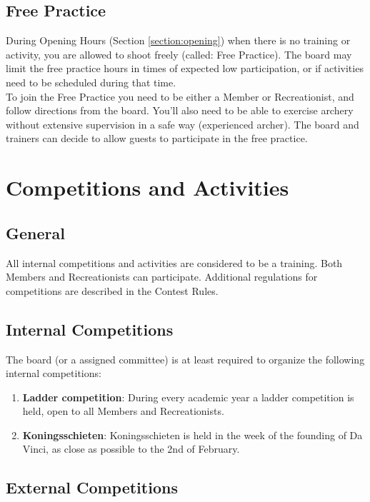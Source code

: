 \documentclass[a4paper]{article}
\newcommand{\Awr}{Contest Rules} %
\begin{document}
\subsection{Free Practice}
During Opening Hours (Section \ref{section:opening}) when there is no training or activity, you are allowed to shoot freely (called: Free Practice). The board may limit the free practice hours in times of expected low participation, or if activities need to be scheduled during that time. \\

To join the Free Practice you need to be either a { Member} or { Recreationist}, and follow directions from the board. You'll also need to be able to exercise archery without extensive supervision in a safe way ({ experienced} { archer}). The board and trainers can decide to allow { guests} to participate in the free practice.

\section{Competitions and Activities}
\subsection{General}
All internal competitions and activities are considered to be a training. Both { Members} and { Recreationists} can participate. Additional regulations for competitions are described in the { \Awr}.

\subsection{Internal Competitions}
The board (or a assigned committee) is at least required to organize the following internal competitions: \\
\begin{enumerate}
\item \textbf{Ladder competition}: During every academic year a ladder competition is held, open to all { Members} and { Recreationists}.
\item \textbf{Koningsschieten}: Koningsschieten is held in the week of the founding of Da Vinci, as close as possible to the 2nd of February.
\end{enumerate}

\subsection{External Competitions}
\end{document}
